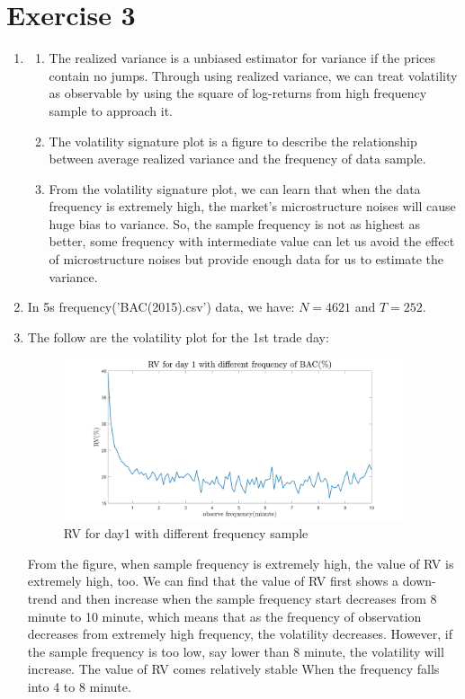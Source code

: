 \documentclass[12pt,letterpaper]{article}
\begin{document}
\section*{Exercise 3}
  \begin{enumerate}[label=\textbf{(\Alph*)}]
  \item 
  \begin{enumerate}[label=(\roman*)]
  	    \item The realized variance is a unbiased estimator for variance if the prices contain no jumps. Through using realized variance, we can treat volatility as observable by using the square of log-returns from high frequency sample to approach it.   
  	    \item The volatility signature plot is a figure to describe the relationship between average realized variance and the frequency of data sample. 
  	    \item From the volatility signature plot, we can learn that when the data frequency is extremely high, the market's microstructure noises will cause huge bias to variance. So, the sample frequency is not as highest as better, some frequency with intermediate value can let us avoid the effect of microstructure noises but provide enough data for us to estimate the variance.\\
  	    
      \end{enumerate}	
 	      
\item  
In 5s frequency('BAC(2015).csv') data, we have: $N=4621$ and $T=252$.\\

\item The follow are the volatility plot for the 1st trade day:
\begin{figure}[H]
            \centering
            \includegraphics[width=10cm]{figures/p2_ex3_c_BAC(2015).jpg}
            \caption{RV for day1 with different frequency sample}
            \label{fig:7}
        \end{figure}
From the figure, when sample frequency is extremely high, the value of RV is extremely high, too. We can find that the value of RV first shows a down-trend and then increase when the sample frequency start decreases from 8 minute to 10 minute, which means that as the frequency of observation decreases from extremely high frequency, the volatility decreases. However, if the sample frequency is too low, say lower than 8 minute, the volatility will increase. The value of RV comes relatively stable When the frequency falls into 4 to 8 minute.  \\


\end{enumerate}
\end{document}
